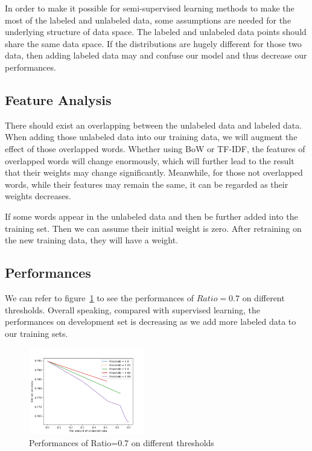 In order to make it possible for semi-supervised learning methods to make the most of the labeled and unlabeled data, some assumptions are needed for the underlying structure of data space. The labeled and unlabeled data points should share the same data space. If the distributions are hugely different for those two data, then adding labeled data may and confuse our model and thus decrease our performances.

\subsection{\textbf{Feature Analysis}}

There should exist an overlapping between the unlabeled data and labeled data. When adding those unlabeled data into our training data, we will augment the effect of those overlapped words. Whether using BoW or TF-IDF, the features of overlapped words will change enormously, which will further lead to the result that their weights may change significantly. Meanwhile, for those not overlapped words, while their features may remain the same, it can be regarded as their weights decreases.

If some words appear in the unlabeled data and then be further added into the training set. Then we can assume their initial weight is zero. After retraining on the new training data, they will have a weight. 

\subsection{\textbf{Performances}}

We can refer to figure~\ref{fig:threshold} to see the performances of $Ratio=0.7$ on different thresholds. Overall speaking, compared with supervised learning, the performances on development set is decreasing as we add more labeled data to our training sets. 

\begin{figure}[!ht]
    \centering
    \includegraphics[width=0.45\textwidth]{files/figs/semi.png}
    \caption[]%
    {{\small Performances of Ratio=0.7 on different thresholds}}
    \label{fig:threshold}
\end{figure}

